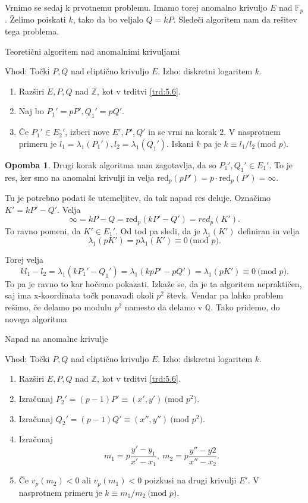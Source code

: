 \documentclass[12pt,a4paper,twoside]{article}
\theoremstyle{definition} %
\newtheorem{opomba}[definicija]{Opomba}
\theoremstyle{plain} %
\numberwithin{equation}{section}  %
\newcommand{\Z}{\mathbb Z}
\newcommand{\Q}{\mathbb Q}
\newcommand{\F}{\mathbb F}
\newcommand{\MOD}[1]{\ \text{(mod }{#1}\text{)}}
\begin{document}
Vrnimo se sedaj k prvotnemu problemu. Imamo torej anomalno krivuljo $E$ nad $\F_p$. Želimo poiskati $k$, tako da bo veljalo $Q = kP$. Sledeči algoritem nam da rešitev tega problema.

\begin{algorithm}[H]
\caption[AN]{Teoretični algoritem nad anomalnimi krivuljami}
\label{alg:Anomal}
Vhod: Točki $P, Q$ nad eliptično krivuljo $E$.\newline
Izho: diskretni logaritem $k$.\newline
\begin{enumerate}
\item Razširi $E,P,Q$ nad $\Z$, kot v trditvi \ref{trd:5.6}.
\item Naj bo $P_1' = pP',Q_1' = pQ'$.
\item Če $P_1' \in E_2'$, izberi nove $E',P',Q'$ in se vrni na korak $2$. V nasprotnem primeru je $l_1 = \lambda_1(P_1'),l_2 = \lambda_1(Q_1')$. Iskani $k$ pa je $k \equiv l_1/l_2 \MOD{p}$.
\end{enumerate}

\end{algorithm}

\begin{opomba}
Drugi korak algoritma nam zagotavlja, da so $P_1',Q_1' \in E_1'$. To je res, ker smo na anomalni krivulji in velja $\text{red}_p(pP') = p\cdot \text{red}_p(P') = \infty$.
\end{opomba}

Tu je potrebno podati še utemeljitev, da tak napad res deluje. Označimo $K' = kP'-Q'$.
Velja
$$\infty = kP-Q = \text{red}_p(kP'-Q') = red_p(K').$$
To ravno pomeni, da $K' \in E_1'$. Od tod pa sledi, da je $\lambda_1(K')$ definiran in velja
$$\lambda_1(pK') = p \lambda_1(K') \equiv 0 \MOD{p}.$$

Torej velja
$$kl_1-l_2 = \lambda_1(kP_1'-Q_1') = \lambda_1(kpP'-pQ') = \lambda_1(pK') \equiv 0 \MOD{p}.$$
To pa je ravno to kar hočemo pokazati.
Izkaže se, da je ta algoritem nepraktičen, saj ima x-koordinata točk ponavadi okoli $p^2$ števk.
Vendar pa lahko problem rešimo, če delamo po modulu $p^2$ namesto da delamo v $\Q$.
Tako pridemo, do novega algoritma

\begin{algorithm}[H]
\caption[ANC]{Napad na anomalne krivulje}
\label{alg:AnomalAttack}
Vhod: Točki $P, Q$ nad eliptično krivuljo $E$.\newline
Izho: diskretni logaritem $k$.\newline
\begin{enumerate}
\item Razširi $E,P,Q$ nad $\Z$, kot v trditvi \ref{trd:5.6}.
\item Izračunaj $P_2' = (p-1)P' \equiv (x',y') \MOD{p^2}$.
\item Izračunaj $Q_2' = (p-1)Q' \equiv(x'',y'') \MOD{p^2}$.
\item Izračunaj
$$m_1 = p\frac{y'-y_1}{x'-x_1}, \ m_2 = p\frac{y''-y2}{x''-x_2}.$$
\item Če $v_p(m_2) <0$ ali $v_p(m_1)<0$ poizkusi na drugi krivulji $E'$. V nasprotnem primeru je $k \equiv m_1/m_2 \MOD{p}$.
\end{enumerate}

\end{algorithm}
\end{document}

